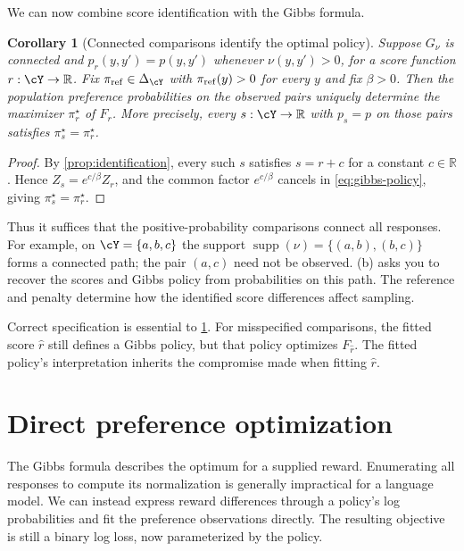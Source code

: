 \documentclass[11pt,twoside]{article}
\newcommand{\R}{\mathbb R}
\newtheorem{corollary}[theorem]{Corollary}
\theoremstyle{definition}
\theoremstyle{remark}
\begin{document}
We can now combine score identification with the Gibbs formula.

\begin{corollary}[Connected comparisons identify the optimal policy]
\label{cor:policy-identification}
Suppose $G_\nu$ is connected and $p_r(y,y')=p(y,y')$ whenever
$\nu(y,y')>0$, for a score function $r:\cY\to\R$. Fix
$\pi_{\rm ref}\in\Delta_{\cY}$ with $\pi_{\rm ref}(y)>0$ for every $y$
and fix $\beta>0$. Then the population preference probabilities on the
observed pairs uniquely determine the maximizer $\pi_r^\star$ of $F_r$.
More precisely, every $s:\cY\to\R$ with $p_s=p$ on those pairs satisfies
$\pi_s^\star=\pi_r^\star$.
\end{corollary}

\begin{proof}
By \cref{prop:identification}, every such $s$ satisfies $s=r+c$ for a
constant $c\in\R$. Hence $Z_s=e^{c/\beta}Z_r$, and the common factor
$e^{c/\beta}$ cancels in \cref{eq:gibbs-policy}, giving
$\pi_s^\star=\pi_r^\star$.
\end{proof}

Thus it suffices that the positive-probability comparisons connect all
responses. For example, on $\cY=\{a,b,c\}$ the support
$\operatorname{supp}(\nu)=\{(a,b),(b,c)\}$ forms a connected path;
the pair $(a,c)$ need not be observed. (b)
asks you to recover the scores and Gibbs policy from probabilities on this
path. The reference and penalty determine how the identified score
differences affect sampling.

Correct specification is essential to \cref{cor:policy-identification}.
For misspecified comparisons, the fitted score
$\widehat r$ still defines a Gibbs policy, but that policy optimizes
$F_{\widehat r}$. The fitted policy's interpretation inherits the compromise made when
fitting $\widehat r$.

\section{Direct preference optimization}
\label{sec:dpo}

The Gibbs formula describes the optimum for a supplied reward. Enumerating
all responses to compute its normalization is generally impractical for a
language model. We can instead express reward differences through a
policy's log probabilities and fit the preference observations directly.
The resulting objective is still a binary log loss, now parameterized by
the policy.
\end{document}
